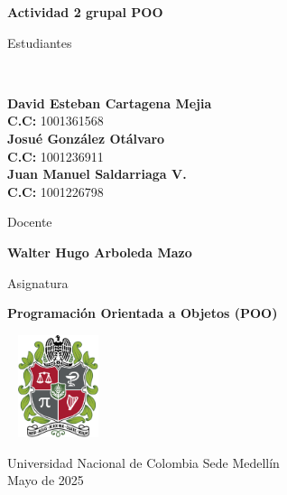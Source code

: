 \begin{titlepage}
	\Large{
	\begin{center}
		\vspace*{1cm}
 
		\textbf{Actividad 2 grupal POO}
 
			 
		\vspace{1.5cm}
		
		Estudiantes
		
		\vspace{0.5cm}
		 \

 
		\textbf{David Esteban Cartagena Mejia} \\
		  \textbf{C.C:} 1001361568 \\	

		\textbf{Josué González Otálvaro} \\
		  \textbf{C.C:} 1001236911 \\	  		 

		 \textbf{Juan Manuel Saldarriaga V.} \\
		  \textbf{C.C:} 1001226798 \\
		  
	 
 
	   \vspace{1cm}
		
		Docente 
		
		\vspace{0.5cm}
 
		\textbf{Walter Hugo Arboleda Mazo}
		\vspace{0.4cm}
		\vspace{1cm}
		
		Asignatura
		
		\vspace{0.5cm}
 
		\textbf{Programación Orientada a Objetos (POO)}
 
		\vfill
 
		\includegraphics[width=3cm,height=3cm]{logo.png}\\[0.2cm]
	  
		\vspace{0.2cm}
	  
				 
		Universidad Nacional de Colombia Sede Medellín\\
		Mayo de 2025
		
	\end{center}
	}
 \end{titlepage}